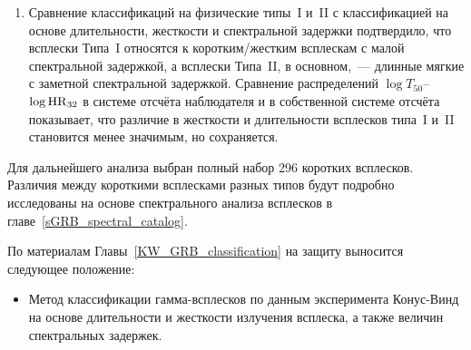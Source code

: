 \begin{enumerate}
\item Сравнение классификаций на физические типы~I и~II с классификацией на основе 
длительности, жесткости и спектральной задержки подтвердило, что всплески Типа~I 
относятся к коротким/жестким всплескам с малой спектральной задержкой, а всплески 
Типа~II, в основном,~--- длинные мягкие с заметной спектральной задержкой. 
Сравнение распределений $\log T_{50}$--$\log {\mathrm{HR}}_{32}$ в системе отсчёта наблюдателя 
и в собственной системе отсчёта показывает, что различие в жесткости и длительности
всплесков типа~I и~II становится менее значимым, но сохраняется.
\end{enumerate}

Для дальнейшего анализа выбран полный набор 296 коротких всплесков. 
Различия между короткими всплесками разных типов будут подробно исследованы на
основе спектрального анализа всплесков в главе~\ref{sGRB_spectral_catalog}.

По материалам Главы~\ref{KW_GRB_classification} на защиту выносится следующее положение:
\begin{itemize}
\item Метод классификации гамма-всплесков по данным эксперимента Конус-Винд на основе
    длительности и жесткости излучения всплеска, а также величин спектральных задержек.
\end{itemize}

\clearpage